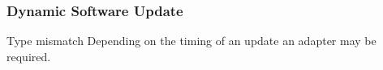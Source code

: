 \documentclass{beamer}
\begin{document}
\begin{frame}[fragile]
  \frametitle{Dynamic Software Update}
  \begin{block}{Type mismatch}
    Depending on the timing of an update an adapter may be required.
  \end{block}

  \begin{example}
    \begin{center}
      \begin{minipage}{.52\textwidth}
       
      \end{minipage}
      \hfill
      \begin{minipage}{.47\textwidth}
        
      \end{minipage}
    \end{center}
  \end{example}
\end{frame}
\end{document}
